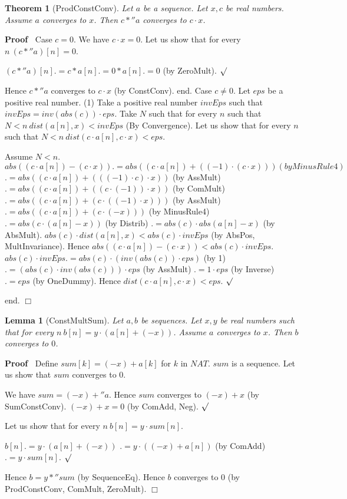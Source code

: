\documentclass{article}
\newenvironment{forthel}{\begin{leftbar}}{\end{leftbar}}
\newenvironment{proof}{\noindent\textbf{Proof\ }}{\hspace*{\fill}$\Box$\medskip}
\newenvironment{subproof}{\begin{list}{}{}
		\item[\text{Proof}]}{\hfill $\surd$ \end{list}}
\newtheorem{lemma}{Lemma}
\newtheorem{theorem}{Theorem}
\begin{document}
\begin{forthel}
	\begin{theorem} [ProdConstConv]
	Let $a$ be a sequence. Let $x,c$ be real numbers. Assume $a$ converges to $x$.
	Then $c *'' a$ converges to $c \cdot x$.
	\end{theorem}
	\begin{proof}
	Case $c = 0$.
	We have $c \cdot x = 0$.
	Let us show that for every $n \ (c *'' a)[n] = 0$. 
	\begin{subproof}
	$(c *'' a)[n] .= c * a[n]
	.= 0 * a[n]
	.= 0$ (by ZeroMult).
	\end{subproof}
	Hence $c *'' a$ converges to $c \cdot x$ (by ConstConv).
	end.
	Case $c \neq 0$.
	Let $eps$ be a positive real number. 
	(1)     Take a positive real number $invEps$ such that $invEps = inv(abs(c)) \cdot eps$.
	Take $N$ such that for every $n$ such that $N < n \ dist(a[n],x) < invEps$ (By Convergence).
	Let us show that for every $n$ such that $N < n \ dist(c \cdot a[n],c \cdot x) < eps$.
	\begin{subproof}
	Assume $N < n$.
	$abs((c \cdot a[n]) - (c \cdot x)) .= abs((c \cdot a[n]) +  ((-1) \cdot (c \cdot x))) (by MinusRule4)$ 
	$.= abs((c \cdot a[n]) + (((-1) \cdot c) \cdot x))$ (by AssMult)
	$.= abs((c \cdot a[n]) + ((c \cdot (-1)) \cdot x))$ (by ComMult)
	$.= abs((c \cdot a[n]) + (c \cdot ((-1) \cdot x)))$ (by AssMult)
	$.= abs((c \cdot a[n]) + (c \cdot (-x)))$ (by MinusRule4)
	$.= abs(c \cdot (a[n] - x))$ (by Distrib)
	$.= abs(c) \cdot abs(a[n] - x)$ (by AbsMult).
	$abs(c) \cdot dist(a[n],x) < abs(c) \cdot invEps$ (by AbsPos, MultInvariance).
	Hence $abs((c \cdot a[n]) - (c \cdot x)) < abs(c) \cdot invEps$.
	$abs(c) \cdot invEps .= abs(c) \cdot (inv(abs(c)) \cdot eps)$ (by 1)
	$.= (abs(c) \cdot inv(abs(c))) \cdot eps$ (by AssMult)
	$.= 1 \cdot eps$ (by Inverse)
	$.= eps$ (by OneDummy).
	Hence $dist(c \cdot a[n],c \cdot x) < eps$.
	\end{subproof}
	end.
	\end{proof}

	\begin{lemma} [ConstMultSum]
	Let $a,b$ be sequences. Let $x,y$ be real numbers such that for every $n\ b[n] = y \cdot (a[n] + (-x))$. Assume $a$ converges to $x$.
	Then $b$ converges to $0$.
	\end{lemma}
	\begin{proof}
	Define $sum[k] = (-x) + a[k]$ for $k$ in $NAT$.
	$sum$ is a sequence.
	Let us show that $sum$ converges to $0$.
	\begin{subproof}
	We have $sum = (-x) +'' a$.
	Hence $sum$ converges to $(-x) + x$ (by SumConstConv).
	$(-x) + x = 0$ (by ComAdd, Neg).
	\end{subproof}
	Let us show that for every $n\ b[n] = y \cdot sum[n]$.
	\begin{subproof}
	$b[n] .= y \cdot (a[n] + (-x))$
	$.= y \cdot ((-x) + a[n])$ (by ComAdd)
	$.= y \cdot sum[n]$.
	\end{subproof}
	Hence $b = y *'' sum$ (by SequenceEq).
	Hence $b$ converges to $0$ (by ProdConstConv, ComMult, ZeroMult).
	\end{proof}
	

\end{forthel}
\end{document}
